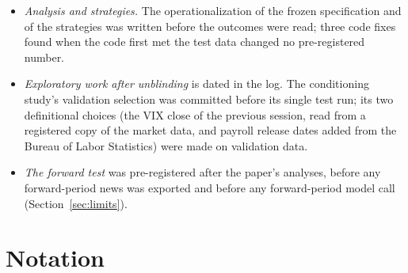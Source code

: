 \begin{itemize}[leftmargin=*, itemsep=1pt]
  inputs, the day's overnight move, is a test-period outcome; the model was unchanged and first reproduced its
  validation predictions exactly.
\item \emph{Analysis and strategies.} The operationalization of the frozen specification and of the strategies
  was written before the outcomes were read; three code fixes found when the code first met the test data changed
  no pre-registered number.
\item \emph{Exploratory work after unblinding} is dated in the log. The conditioning study's validation selection
  was committed before its single test run; its two definitional choices (the VIX close of the previous session,
  read from a registered copy of the market data, and payroll release dates added from the Bureau of Labor
  Statistics) were made on validation data.
\item \emph{The forward test} was pre-registered after the paper's analyses, before any forward-period news was
  exported and before any forward-period model call (Section~\ref{sec:limits}).
\end{itemize}


\section{Notation}\label{app:notation}

